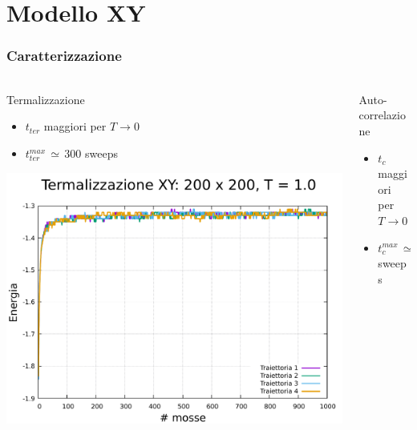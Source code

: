 \section{Modello XY}

\begin{frame}
    \frametitle{Caratterizzazione}
    \framesubtitle{}

    \begin{columns}
        \begin{column}{0.33\textwidth}
            \begin{block}{Termalizzazione}
                \begin{itemize}[itemsep=0.5em, label=$\diamond$]
                    \item $t_{ter}$ maggiori per $T \to 0$
                    \item $t_{ter}^{max}\,\simeq\,300$ sweeps
                \end{itemize}

                \vspace{0.5cm}

                \centering
                \includegraphics[width=\textwidth]{Immagini/simXY/term_200_1.0.pdf}
            \end{block}
        \end{column}
    
        \begin{column}{0.33\textwidth}
            \begin{block}{Auto-correlazione}
                \begin{itemize}[itemsep=0.5em, label=$\diamond$]
                    \item $t_{c}$ maggiori per $T \to 0$
                    \item $t_{c}^{max}\,\simeq\,5000$ sweeps
                \end{itemize}


\end{block}
\end{column}
\end{columns}
\end{frame}
